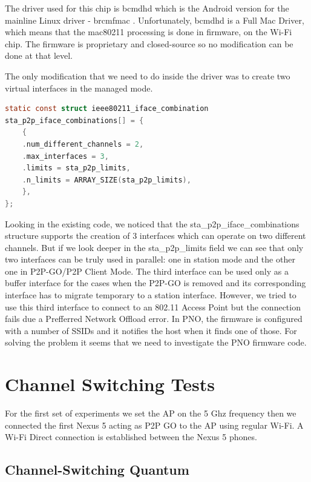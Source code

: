 The driver used for this chip is bcmdhd which is the Android version for the mainline Linux driver - brcmfmac \cite{cite-brcmfmac}. Unfortunately, bcmdhd is a Full Mac Driver, which means that the mac80211 processing is done in firmware, on the Wi-Fi chip. The firmware is proprietary and closed-source so no modification can be done at that level.

The only modification that we need to do inside the driver was to create two virtual interfaces in the managed mode. 

\begin{lstlisting}[language=C, frame=single, caption={Interface combinations for bcmdh driver},label=InterfaceCombinations]
static const struct ieee80211_iface_combination
sta_p2p_iface_combinations[] = {
	{
	.num_different_channels = 2,
	.max_interfaces = 3,
	.limits = sta_p2p_limits,
	.n_limits = ARRAY_SIZE(sta_p2p_limits),
	},
};
\end{lstlisting}

Looking in the existing code, we noticed that the sta_p2p_iface_combinations structure supports the creation of 3 interfaces which can operate on two different channels. But if we look deeper in the sta_p2p_limits field we can see that only two interfaces can be truly used in parallel: one in station mode and the other one in P2P-GO/P2P Client Mode. The third interface can be used only as a buffer interface for the cases when the P2P-GO is removed and its corresponding interface has to migrate temporary to a station interface. However, we tried to use this third interface to connect to an 802.11 Access Point but the connection fails due a Prefferred Network Offload error. In PNO, the firmware is configured with a number of SSIDs and it notifies the host when it finds one of those. For solving the problem it seems that we need to investigate the PNO firmware code.

\section{Channel Switching Tests}
\label{sec:nexus5-chsw}

For the first set of experiments we set the AP on the 5 Ghz frequency then we connected the first Nexus 5 acting as P2P GO to the AP using regular Wi-Fi. A Wi-Fi Direct connection is established between the Nexus 5 phones.
 

\subsection{Channel-Switching Quantum}
\label{sub-sec:chsw-time}

